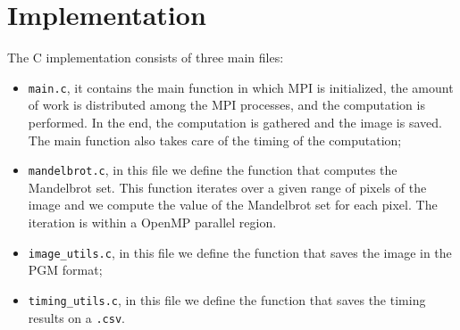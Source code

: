 \section{Implementation}

The C implementation consists of three main files:
\begin{itemize}
    \item \texttt{main.c}, it contains the main function in which MPI is initialized, the amount of work is distributed among the MPI processes, and the computation is performed. In the end, the computation is gathered and the image is saved. The main function also takes care of the timing of the computation;
    \item \texttt{mandelbrot.c}, in this file we define the function that computes the Mandelbrot set. This function iterates over a given range of pixels of the image and we compute the value of the Mandelbrot set for each pixel. The iteration is within a OpenMP parallel region.
    \item \texttt{image\_utils.c}, in this file we define the function that saves the image in the PGM format;
    \item \texttt{timing\_utils.c}, in this file we define the function that saves the timing results on a \texttt{.csv}.
\end{itemize}



